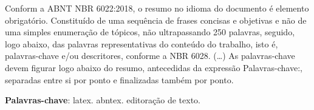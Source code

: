  Conform a ABNT NBR 6022:2018, o resumo no idioma do documento é elemento obrigatório. 
Constituído de uma sequência de frases concisas e objetivas e não de uma 
simples enumeração de tópicos, não ultrapassando 250 palavras, seguido, logo 
abaixo, das palavras representativas do conteúdo do trabalho, isto é, 
palavras-chave e/ou descritores, conforme a NBR 6028. (\ldots) As 
palavras-chave devem figurar logo abaixo do resumo, antecedidas da expressão 
Palavras-chave:, separadas entre si por ponto e finalizadas também por ponto.

\vspace{\onelineskip}

\noindent
\textbf{Palavras-chave}: latex. abntex. editoração de texto.